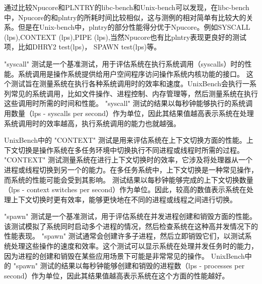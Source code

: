 通过比较Npucore和PLNTRY的libc-bench和Unix-bench可以发现，在libc-bench中，Npucore的和plntry的所耗时间比较相似，这与测例的相对简单有比较大的关系。但是在Unix-bench中，plntry的部分性能得分优于Npucore。例如SYSCALL (lps),CONTEXT (lps),PIPE (lps),当然Npucore也有比plntry表现更良好的测试项，比如DHRY2 test(lps)， SPAWN test(lps)等。

"syscall" 测试是一个基准测试，用于评估系统在执行系统调用（syscalls）时的性能。系统调用是操作系统提供给用户空间程序访问操作系统内核功能的接口。
这个测试旨在测量系统在执行各种系统调用时的效率和速度。UnixBench会执行一系列常见的系统调用，比如文件操作、进程控制、内存管理等，然后测量系统在执行这些调用时所需的时间和性能。
"syscall" 测试的结果以每秒钟能够执行的系统调用数量（lps - syscalls per second）作为单位，因此其结果值越高表示系统在处理系统调用时的效率越高，执行系统调用的能力也就越强。

UnixBench中的 "CONTEXT" 测试是用来评估系统在上下文切换方面的性能。上下文切换是操作系统在多任务环境中切换执行不同进程或线程时所需的过程。
"CONTEXT" 测试测量系统在进行上下文切换时的效率，它涉及将处理器从一个进程或线程切换到另一个的能力。在多任务系统中，上下文切换是一种常见操作，而系统的性能可能会受到其影响。
测试结果以每秒钟能够完成的上下文切换数量（lps - context switches per second）作为单位。因此，较高的数值表示系统在处理上下文切换时更有效率，能够更快地在不同的进程或线程之间进行切换。

"spawn" 测试是一个基准测试，用于评估系统在并发进程创建和销毁方面的性能。该测试模拟了系统同时启动多个进程的情况，然后检查系统在这种高并发情况下的性能表现。
"spawn" 测试通常会创建许多子进程，然后立即销毁它们，以测试系统处理这些操作的速度和效率。这个测试可以显示系统在处理并发任务时的能力，因为进程的创建和销毁在某些应用场景下可能是非常常见的操作。
UnixBench中的 "spawn" 测试的结果以每秒钟能够创建和销毁的进程数（lps - processes per second）作为单位，因此其结果值越高表示系统在这个方面的性能越好。


